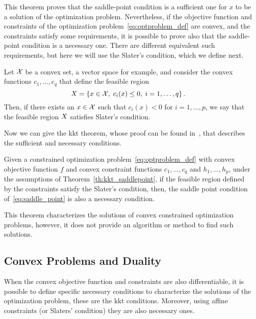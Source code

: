 This theorem proves that the saddle-point condition is a sufficient one for $x$ to be a solution of the optimization problem.
Nevertheless, if the objective function and constraints of the optimization problem~\eqref{eq:optproblem_def} are convex, and the constraints satisfy some requirements, it is possible to prove also that the saddle-point condition is a necessary one.
There are different equivalent such requirements, but here we will use the Slater's condition, which we define next.
\begin{definition}
    Let $\mathcal{X}$ be a convex set, a vector space for example, and consider the convex functions $c_1, \ldots, c_q$ that define the feasible region
    \begin{equation}
        X = \left\{x \in \mathcal{X}, \; c_i(x) \leq 0, \; i=1, \ldots, q\right\} .
    \end{equation}  
    Then, if there exists an $x \in \mathcal{X}$ such that $c_i(x) < 0$ for $i=1, \ldots, p$, we say that the feasible region $X$ satisfies Slater's condition.       
\end{definition}
Now we can give the \acrshort{kkt} theorem, whose proof can be found in~\citet{ScholkopfS02}, that describes the sufficient and necessary conditions.
\begin{theorem}
    Given a constrained optimization problem~\eqref{eq:optproblem_def} with convex objective function $f$ and convex constraint functions $c_1, \ldots, c_q$ and $h_1, \ldots, h_p$, 
    under the assumptions of Theorem~\ref{th:kkt_saddlepoint}, if the feasible region defined by the constraints satisfy the Slater's condition, then, the saddle point condition of~\eqref{eq:saddle_point} is also a necessary condition.
\end{theorem}
This theorem characterizes the solutions of convex constrained optimization problems, however, it does not provide an algorithm or method to find such solutions.

\subsection{Convex Problems and Duality}
When the convex objective function and constraints are also differentiable, it is possible to define specific necessary conditions to characterize the solutions of the optimization problem, these are the \acrshort{kkt} conditions. Moreover, using affine constraints (or Slaters' condition) they are also necessary ones.

